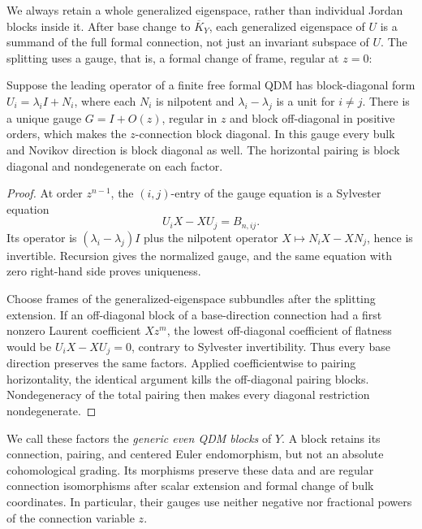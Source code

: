 We always retain a whole generalized eigenspace, rather than individual
Jordan blocks inside it. After base change to \(\overline K_Y\), each generalized eigenspace of \(U\) is
a summand of the full formal connection, not just an invariant subspace of
\(U\). The splitting uses a gauge, that is, a formal change of frame,
regular at \(z=0\):

\begin{proposition}
\label{prop:generic-spectral-connection-splitting}
%
%
Suppose the leading operator of a finite free formal QDM has block-diagonal
form \(U_i=\lambda_iI+N_i\), where each \(N_i\) is nilpotent and
\(\lambda_i-\lambda_j\) is a unit for \(i\ne j\).  There is a unique gauge
\(G=I+O(z)\), regular in \(z\) and block off-diagonal in positive orders,
which makes the \(z\)-connection block diagonal.  In this gauge every bulk
and Novikov direction is block diagonal as well.  The horizontal pairing is
block diagonal and nondegenerate on each factor.
\end{proposition}

\begin{proof}
At order \(z^{n-1}\), the \((i,j)\)-entry of the gauge equation is a Sylvester
equation
\[
 U_iX-XU_j=B_{n,ij}.
\]
Its operator is \((\lambda_i-\lambda_j)I\) plus the nilpotent operator
\(X\mapsto N_iX-XN_j\), hence is invertible.  Recursion gives the normalized
gauge, and the same equation with zero right-hand side proves uniqueness.

Choose frames of the generalized-eigenspace subbundles after the splitting
extension.  If an off-diagonal block of a base-direction connection had a
first nonzero Laurent coefficient \(Xz^m\), the lowest off-diagonal coefficient
of flatness would be \(U_iX-XU_j=0\), contrary to Sylvester invertibility.
Thus every base direction preserves the same factors.  Applied coefficientwise
to pairing horizontality, the identical argument kills the off-diagonal pairing
blocks.  Nondegeneracy of the total pairing then makes every diagonal
restriction nondegenerate.
\end{proof}

We call these factors the \emph{generic even QDM blocks} of \(Y\).
A block retains its connection, pairing, and centered Euler endomorphism, but not an
absolute cohomological grading. Its morphisms preserve these data and are
regular connection isomorphisms after scalar extension and formal change
of bulk coordinates.  In particular, their gauges use
neither negative nor fractional powers of the connection variable \(z\).


